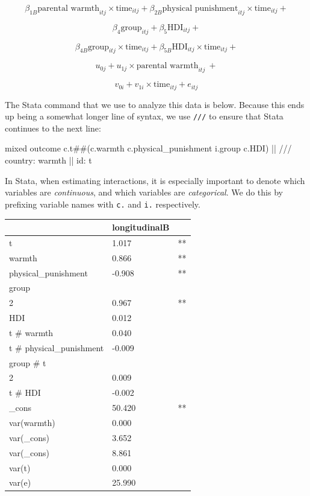 \documentclass[
  letterpaper,
  DIV=11,
  numbers=noendperiod]{scrreprt}
\newenvironment{Shaded}{\begin{snugshade}}{\end{snugshade}}
\newcommand{\CommentTok}[1]{\textcolor[rgb]{0.37,0.37,0.37}{#1}}
\newcommand{\FunctionTok}[1]{\textcolor[rgb]{0.28,0.35,0.67}{#1}}
\newcommand{\NormalTok}[1]{\textcolor[rgb]{0.00,0.23,0.31}{#1}}
\begin{document}
\[\beta_{1B} \text{parental warmth}_{itj} \times \text{time}_{itj} + \beta_{2B} \text{physical punishment}_{itj} \times \text{time}_{itj} +\]

\[\beta_4 \text{group}_{itj} + \beta_5 \text{HDI}_{itj} +\]

\[\beta_{4B} \text{group}_{itj} \times \text{time}_{itj} + \beta_{5B} \text{HDI}_{itj} \times \text{time}_{itj} +\]

\[u_{0j} + u_{1j} \times \text{parental warmth}_{itj} \ + \]

\[v_{0i} + v_{1i} \times \text{time}_{itj} + e_{itj}\]

The Stata command that we use to analyze this data is below. Because
this ends up being a somewhat longer line of syntax, we use \texttt{///}
to ensure that Stata continues to the next line:

\begin{Shaded}
\begin{Highlighting}[]

\NormalTok{mixed outcome c.t\#\#(c.warmth c.physical\_punishment i.}\FunctionTok{group}\NormalTok{ c.HDI) || }\CommentTok{///}
\NormalTok{country: warmth || id: t}
\end{Highlighting}
\end{Shaded}

In Stata, when estimating interactions, it is especially important to
denote which variables are \emph{continuous}, and which variables are
\emph{categorical}. We do this by prefixing variable names with
\texttt{c.} and \texttt{i.} respectively.

\begin{longtable}[]{@{}lll@{}}
\toprule\noalign{}
& longitudinalB & \\
\midrule\noalign{}
\endhead
\bottomrule\noalign{}
\endlastfoot
t & 1.017 & ** \\
warmth & 0.866 & ** \\
physical\_punishment & -0.908 & ** \\
group & & \\
2 & 0.967 & ** \\
HDI & 0.012 & \\
t \# warmth & 0.040 & \\
t \# physical\_punishment & -0.009 & \\
group \# t & & \\
2 & 0.009 & \\
t \# HDI & -0.002 & \\
\_cons & 50.420 & ** \\
var(warmth) & 0.000 & \\
var(\_cons) & 3.652 & \\
var(\_cons) & 8.861 & \\
var(t) & 0.000 & \\
var(e) & 25.990 & \\
\end{longtable}
\end{document}
